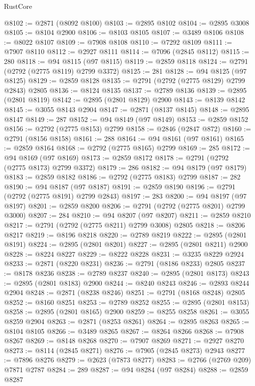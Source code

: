 \begin{lexlean}{RustCore}
\begin{coremodule}
@8102 := @2871 (@8092 @8100)
@8103 := @2895 @8102
@8104 := @2895 @3008
@8105 := @8104 @2900
@8106 := @8103 @8105
@8107 := @3489 @8106
@8108 := @8022 @8107
@8109 := @7908 @8108
@8110 := @7292 @8109
@8111 := @7907 @8110
@8112 := @2927 @8111
@8114 := @7096 (@2845 @8112)
@8115 := 280
@8118 := @94 @8115 (@97 @8115)
@8119 := @2859 @8118
@8124 := @2791 (@2792 (@2775 @8119) @2799 @3372)
@8125 := 281
@8128 := @94 @8125 (@97 @8125)
@8129 := @2859 @8128
@8135 := @2791 (@2792 (@2775 @8129) @2799 @2843) @2805
@8136 := @8124 @8135
@8137 := @2789 @8136
@8139 := @2895 (@2801 @8119)
@8142 := @2895 (@2801 @8129) @2900
@8143 := @8139 @8142
@8145 := @3055 @8143 @2904
@8147 := @2871 (@8137 @8145)
@8148 := @2895 @8147
@8149 := 287
@8152 := @94 @8149 (@97 @8149)
@8153 := @2859 @8152
@8156 := @2792 (@2775 @8153) @2799
@8158 := @2846 (@2847 @872)
@8160 := @2791 (@8156 @8158)
@8161 := 288
@8164 := @94 @8161 (@97 @8161)
@8165 := @2859 @8164
@8168 := @2792 (@2775 @8165) @2799
@8169 := 285
@8172 := @94 @8169 (@97 @8169)
@8173 := @2859 @8172
@8178 := @2791 (@2792 (@2775 @8173) @2799 @3372)
@8179 := 286
@8182 := @94 @8179 (@97 @8179)
@8183 := @2859 @8182
@8186 := @2792 (@2775 @8183) @2799
@8187 := 282
@8190 := @94 @8187 (@97 @8187)
@8191 := @2859 @8190
@8196 := @2791 (@2792 (@2775 @8191) @2799 @2843)
@8197 := 283
@8200 := @94 @8197 (@97 @8197)
@8201 := @2859 @8200
@8206 := @2791 (@2792 (@2775 @8201) @2799 @3000)
@8207 := 284
@8210 := @94 @8207 (@97 @8207)
@8211 := @2859 @8210
@8217 := @2791 (@2792 (@2775 @8211) @2799 @3008) @2805
@8218 := @8206 @8217
@8219 := @8196 @8218
@8220 := @2789 @8219
@8222 := @2895 (@2801 @8191)
@8224 := @2895 (@2801 @8201)
@8227 := @2895 (@2801 @8211) @2900
@8228 := @8224 @8227
@8229 := @8222 @8228
@8231 := @3235 @8229 @2924
@8233 := @2871 (@8220 @8231)
@8236 := @2791 (@8186 @8233) @2805
@8237 := @8178 @8236
@8238 := @2789 @8237
@8240 := @2895 (@2801 @8173)
@8243 := @2895 (@2801 @8183) @2900
@8244 := @8240 @8243
@8246 := @2893 @8244 @2904
@8248 := @2871 (@8238 @8246)
@8251 := @2791 (@8168 @8248) @2805
@8252 := @8160 @8251
@8253 := @2789 @8252
@8255 := @2895 (@2801 @8153)
@8258 := @2895 (@2801 @8165) @2900
@8259 := @8255 @8258
@8261 := @3055 @8259 @2904
@8263 := @2871 (@8253 @8261)
@8264 := @2895 @8263
@8265 := @8104 @8105
@8266 := @3489 @8265
@8267 := @8264 @8266
@8268 := @7908 @8267
@8269 := @8148 @8268
@8270 := @7907 @8269
@8271 := @2927 @8270
@8273 := @8114 (@2845 @8271)
@8276 := @7905 (@2845 @8273) @2943
@8277 := @7896 @8276
@8279 := @2623 (@7873 @8277)
@8283 := @2766 (@2769 @209) @7871 @2787
@8284 := 289
@8287 := @94 @8284 (@97 @8284)
@8288 := @2859 @8287

\end{coremodule}
\end{lexlean}
